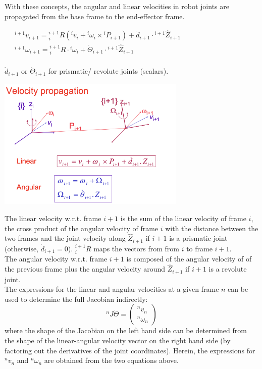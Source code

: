 With these concepts, the angular and linear velocities in robot joints are propagated from the base frame to the end-effector frame.

\begin{minipage}[c]{0.5\textwidth}
$
\begin{aligned}
	&\ {}^{i+1} v_{i+1} = {}^{i+1}_{i} R ({}^{i} v_{i} + {}^{i} \omega_{i} \times {}^{i} P_{i+1}) + \dot{d}_{i+1} \cdot {}^{i+1} \hat{Z}_{i+1}\\
	&\ {}^{i+1} \omega_{i+1} = {}^{i+1}_{i} R \cdot {}^{i} \omega_{i} + \dot{\Theta}_{i+1} \cdot {}^{i+1} \hat{Z}_{i+1}\\
\end{aligned}
$
\begin{center}
	$\dot{d}_{i+1}$ or $\dot{\Theta}_{i+1}$ for prismatic/ revolute joints (scalars).
\end{center}

\end{minipage}
\hfill
\begin{minipage}[c]{0.5\textwidth}
\includegraphics[width=9cm]{sections/imgs/4_velocity_propagation.png}\end{minipage}

The linear velocity w.r.t. frame $i+1$ is the sum of the linear velocity of frame $i$, the cross product of the angular velocity of frame $i$ with the distance between the two frames and the joint velocity along $\hat Z_{i+1}$ if $i+1$ is a prismatic joint (otherwise, $\dot{d}_{i+1}=0$). ${}^{i+1}_{i} R$ maps the vectors from from $i$ to frame $i+1$.\\
The angular velocity w.r.t. frame $i+1$ is composed of the  angular velocity of of the previous frame plus the angular velocity around $\hat Z_{i+1}$ if $i+1$ is a revolute joint.\\

The expressions for the linear and angular velocities at a given frame $n$ can be used to determine the full Jacobian indirectly:
\[ {}^{n} J \dot{\Theta} = \begin{pmatrix} {}^{n} v_n \\ {}^{n} \omega_{n} \end{pmatrix} \]
where the shape of the Jacobian on the left hand side can be determined from the shape of the linear-angular velocity vector on the right hand side (by factoring out the derivatives of the joint coordinates). Herein, the expressions for ${}^{n} v_n$ and ${}^{n} \omega_{n}$ are obtained from the two equations above.

